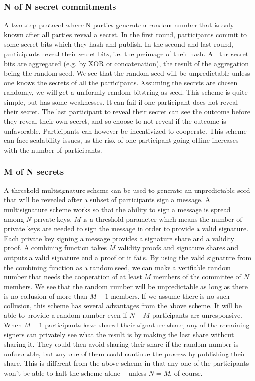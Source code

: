 \subsubsection{N of N  secret commitments}
A two-step protocol where N parties generate a random number that is only known after all parties reveal a secret.
In the first round, participants commit to some secret bits which they hash and publish. In the second and last round, participants reveal their secret bits, i.e. the preimage of their hash. All the secret bits are aggregated (e.g. by XOR or concatenation), the result of the aggregation being the random seed. We see that the random seed will be unpredictable unless one knows the secrets of all the participants. Assuming the secrets are chosen randomly, we will get a uniformly random bitstring as seed.
This scheme is quite simple, but has some weaknesses. It can fail if one participant does not reveal their secret. The last participant to reveal their secret can see the outcome before they reveal their own secret, and so choose to not reveal if the outcome is unfavorable. Participants can however be incentivized to cooperate. This scheme can face scalability issues, as the risk of one participant going offline increases with the number of participants.

\subsubsection{M of N secrets}
A threshold multisignature scheme can be used to generate an unpredictable seed that will be revealed after a subset of participants sign a message.
A multisignature scheme works so that the ability to sign a message is spread among $N$ private keys. $M$ is a threshold parameter which means the number of private keys are needed to sign the message in order to provide a valid signature. Each private key signing a message provides a signature share and a validity proof. A combining function takes $M$ validity proofs and signature shares and outputs a valid signature and a proof or it fails. By using the valid signature from the combining function as a random seed, we can make a verifiable random number that needs the cooperation of at least $M$ members of the committee of $N$ members.  
We see that the random number will be unpredictable as long as there is no collusion of more than $M-1$ members. If we assume there is no such collusion, this scheme has several advantages from the above scheme. It will be able to provide a random number even if $N-M$ participants are unresponsive. When $M-1$ participants have shared their signature share, any of the remaining signers can privately see what the result is by making the last share without sharing it. They could then avoid sharing their share if the random number is unfavorable, but any one of them could continue the process by publishing their share. This is different from the above scheme in that any one of the participants won't be able to halt the scheme alone – unless $N=M$, of course.

